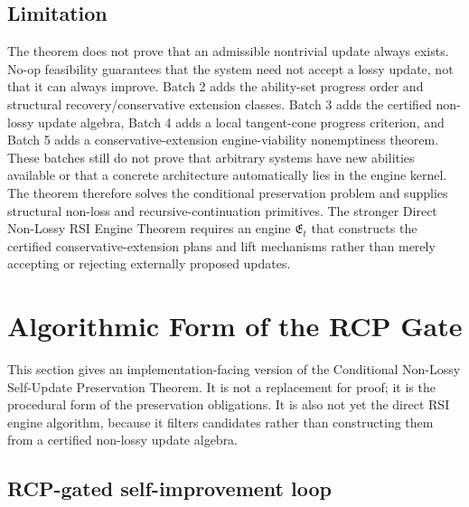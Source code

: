 \documentclass[11pt]{article}
\newcommand{\1}{\mathbf{1}}
\begin{document}
\subsection{Limitation}

The theorem does not prove that an admissible nontrivial update always exists. No-op feasibility guarantees that the system need not accept a lossy update, not that it can always improve. Batch 2 adds the ability-set progress order and structural recovery/conservative extension classes. Batch 3 adds the certified non-lossy update algebra, Batch 4 adds a local tangent-cone progress criterion, and Batch 5 adds a conservative-extension engine-viability nonemptiness theorem. These batches still do not prove that arbitrary systems have new abilities available or that a concrete architecture automatically lies in the engine kernel. The theorem therefore solves the conditional preservation problem and supplies structural non-loss and recursive-continuation primitives. The stronger Direct Non-Lossy RSI Engine Theorem requires an engine \(\mathfrak E_t\) that constructs the certified conservative-extension plans and lift mechanisms rather than merely accepting or rejecting externally proposed updates.

\section{Algorithmic Form of the RCP Gate}

This section gives an implementation-facing version of the Conditional Non-Lossy Self-Update Preservation Theorem. It is not a replacement for proof; it is the procedural form of the preservation obligations. It is also not yet the direct RSI engine algorithm, because it filters candidates rather than constructing them from a certified non-lossy update algebra.

\subsection{RCP-gated self-improvement loop}
\end{document}
